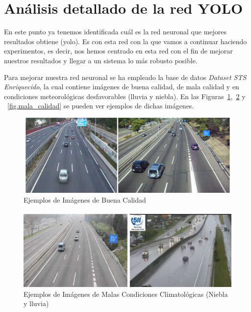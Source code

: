 \section{Análisis detallado de la red YOLO}

En este punto ya tenemos identificada cuál es la red neuronal que mejores resultados obtiene (\acrshort{yolo}). Es con esta red con la que vamos a continuar haciendo experimentos, es decir, nos hemos centrado en esta red con el fin de mejorar nuestros resultados y llegar a un sistema lo más robusto posible.

Para mejorar nuestra red neuronal se ha empleado la base de datos \textit{Dataset STS Enriquecido}, la cual contiene imágenes de buena calidad, de mala calidad y en condiciones meteorológicas desfavorables (lluvia y niebla). En las Figuras~\ref{fig.buena_calidad},~\ref{fig.malas_condiciones} y ~\ref{fig.mala_calidad} se pueden ver ejemplos de dichas imágenes.

\begin{figure}[H] 
\begin{center}
	\includegraphics[width=1\textwidth]{figures/Experimentos/buena_calidad.png}
   \caption{Ejemplos de Imágenes de Buena Calidad}
	\label{fig.buena_calidad}
\end{center}
\end{figure}

\begin{figure}[H] 
\begin{center}
	\includegraphics[width=1\textwidth]{figures/Experimentos/malas_condiciones.png}
   \caption{Ejemplos de Imágenes de Malas Condiciones Climatológicas (Niebla y lluvia)}
	\label{fig.malas_condiciones}
\end{center}
\end{figure}

